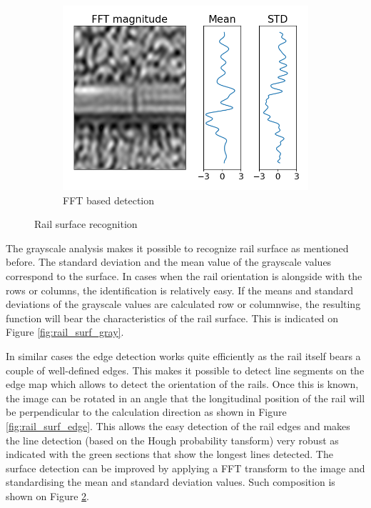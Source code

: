 \documentclass[10pt, final]{article}
\begin{document}
\begin{figure}[!ht]
\begin{subfigure}{0.3\textwidth}
		\includegraphics[width=\textwidth]{./tex_graphs/rail_surf_fft.png}
		\caption{FFT based detection}
		\label{fig:rail_surf_fft}
	\end{subfigure}
	\caption{Rail surface recognition}
\end{figure}

The grayscale analysis makes it possible to recognize rail surface as mentioned before.
The standard deviation and the mean value of the grayscale values correspond to the surface.
In cases when the rail orientation is alongside with the rows or columns, the identification is relatively easy.
If the means and standard deviations of the grayscale values are calculated row or columnwise, the resulting function
will bear the characteristics of the rail surface.
This is indicated on Figure \ref{fig:rail_surf_gray}.

In similar cases the edge detection works quite efficiently as the rail itself bears a couple of well-defined edges.
This makes it possible to detect line segments on the edge map which allows to detect the orientation of the rails.
Once this is known, the image can be rotated in an angle that the longitudinal position of the rail will be
perpendicular to the calculation direction as shown in Figure \ref{fig:rail_surf_edge}.
This allows the easy detection of the rail edges and makes the line detection (based on the Hough probability tansform)
very robust as indicated with the green sections that show the longest lines detected.
The surface detection can be improved by applying a FFT transform to the image and standardising the mean and
standard deviation values.
Such composition is shown on Figure \ref{fig:rail_surf_fft}.
\end{document}
